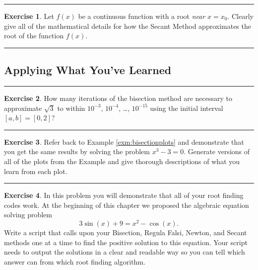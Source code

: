 \documentclass[
]{book}
\theoremstyle{definition}
\theoremstyle{definition}
\theoremstyle{definition}
\newtheorem{exercise}{Exercise}[chapter]
\theoremstyle{remark}
\begin{document}
\begin{center}\rule{0.5\linewidth}{0.5pt}\end{center}

\begin{exercise}
\protect\hypertarget{exr:unnamed-chunk-119}{}{\label{exr:unnamed-chunk-119} }Let \(f(x)\) be a continuous function with a root \emph{near} \(x=x_0\). Clearly
give all of the mathematical details for how the Secant Method
approximates the root of the function \(f(x)\).
\end{exercise}

\begin{center}\rule{0.5\linewidth}{0.5pt}\end{center}

\hypertarget{applying-what-youve-learned-1}{%
\subsection{Applying What You've Learned}\label{applying-what-youve-learned-1}}

\begin{center}\rule{0.5\linewidth}{0.5pt}\end{center}

\begin{exercise}
\protect\hypertarget{exr:unnamed-chunk-120}{}{\label{exr:unnamed-chunk-120} }How many iterations of the bisection method are necessary to approximate
\(\sqrt{3}\) to within \(10^{-3}\), \(10^{-4}\), \ldots, \(10^{-15}\) using the
initial interval \([a,b]=[0,2]\)?
\end{exercise}

\begin{center}\rule{0.5\linewidth}{0.5pt}\end{center}

\begin{exercise}
\protect\hypertarget{exr:unnamed-chunk-121}{}{\label{exr:unnamed-chunk-121} }Refer back to Example \ref{exm:bisectionplots} and demonstrate that you get the same results by solving the problem \(x^3 - 3 = 0\). Generate versions of all of the plots from the Example and give thorough descriptions of what you learn from each plot.
\end{exercise}

\begin{center}\rule{0.5\linewidth}{0.5pt}\end{center}

\begin{exercise}
\protect\hypertarget{exr:unnamed-chunk-122}{}{\label{exr:unnamed-chunk-122} }In this problem you will demonstrate that all of your root finding codes
work. At the beginning of this chapter we proposed the algebraic
equation solving problem \[3\sin(x) + 9 = x^2 - \cos(x).\] Write a
script that calls upon your Bisection, Regula Falsi, Newton, and Secant
methods one at a time to find the positive solution to this equation.
Your script needs to output the solutions in a clear and readable way so
you can tell which answer can from which root finding algorithm.
\end{exercise}
\end{document}
